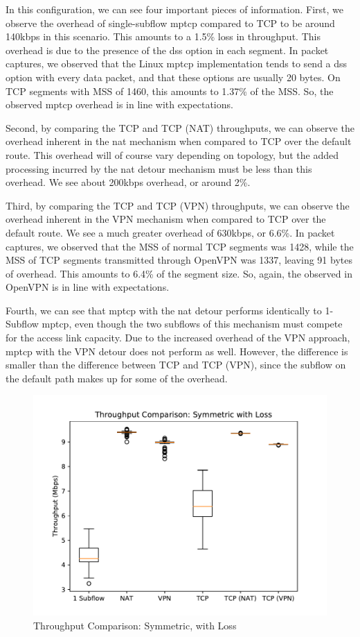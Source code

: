 \documentclass{cwru}
\begin{document}
In this configuration, we can see four important pieces of information. First,
we observe the overhead of single-subflow \ac{mptcp} compared to TCP to be
around 140kbps in this scenario. This amounts to a 1.5\% loss in throughput.
This overhead is due to the presence of the \ac{dss} option in each segment. In
packet captures, we observed that the Linux \ac{mptcp} implementation tends to
send a \ac{dss} option with every data packet, and that these options are
usually 20 bytes. On TCP segments with MSS of 1460, this amounts to 1.37\% of
the MSS. So, the observed \ac{mptcp} overhead is in line with expectations.

Second, by comparing the TCP and TCP (NAT) throughputs, we can observe the
overhead inherent in the \ac{nat} mechanism when compared to TCP over the
default route. This overhead will of course vary depending on topology, but the
added processing incurred by the \ac{nat} detour mechanism must be less than
this overhead. We see about 200kbps overhead, or around 2\%.

Third, by comparing the TCP and TCP (VPN) throughputs, we can observe the
overhead inherent in the VPN mechanism when compared to TCP over the default
route. We see a much greater overhead of 630kbps, or 6.6\%. In packet captures,
we observed that the MSS of normal TCP segments was 1428, while the MSS of TCP
segments transmitted through OpenVPN was 1337, leaving 91 bytes of overhead.
This amounts to 6.4\% of the segment size. So, again, the observed in OpenVPN is
in line with expectations.

Fourth, we can see that \ac{mptcp} with the \ac{nat} detour performs identically
to 1-Subflow \ac{mptcp}, even though the two subflows of this mechanism must
compete for the access link capacity. Due to the increased overhead of the VPN
approach, \ac{mptcp} with the VPN detour does not perform as well. However, the
difference is smaller than the difference between TCP and TCP (VPN), since the
subflow on the default path makes up for some of the overhead.

\begin{figure}[htbp]
  \centering
  \includegraphics[height=0.42\textheight]{figures/sym-lossy.pdf}
  \caption{Throughput Comparison: Symmetric, with Loss}
  \label{fig:sym_lossy}
\end{figure}
\end{document}

